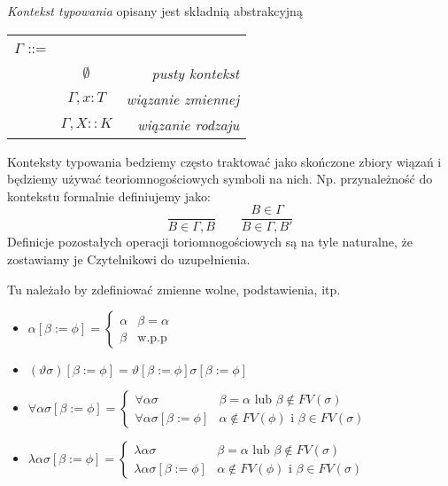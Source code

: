 \documentclass[11pt,leqno]{article}
\begin{document}
\begin{definicja}
	\emph{Kontekst typowania} opisany jest składnią abstrakcyjną
	
	\begin{tabular}{ | l c r | }
		\hline
		$\Gamma$ ::= & & \\
		& $\emptyset$ & \textit{pusty kontekst} \\
		& $\Gamma,x:T$& \textit{wiązanie zmiennej} \\ 
		& $\Gamma,X::K$& \textit{wiązanie rodzaju} \\ 
		\hline
	\end{tabular}
	
	Konteksty typowania bedziemy często traktować jako skończone zbiory wiązań i będziemy
	używać teoriomnogościowych symboli na nich. Np. przynależność do kontekstu formalnie
	definiujemy jako:
	\[
		\frac{}{B \in \Gamma,B}
		\qquad
		\frac{B \in \Gamma}{B \in \Gamma,B'}
	\]
	Definicje pozostałych operacji toriomnogościowych są na tyle naturalne, że zostawiamy
	je Czytelnikowi do uzupełnienia.
\end{definicja}

\begin{definicja}
Tu należało by zdefiniować zmienne wolne, podstawienia, itp.
    \begin{itemize}
        \item $\alpha [\beta := \phi]= \begin{cases}  \alpha & \beta=\alpha \\ \beta & \text{w.p.p} \end{cases}$
        \item $(\vartheta \sigma) [\beta := \phi] = \vartheta [\beta := \phi] \sigma [\beta := \phi]$
        \item $\forall \alpha \sigma [\beta := \phi]= \begin{cases} \forall \alpha \sigma & \beta=\alpha \text{ lub } \beta \notin FV(\sigma)\\ \forall \alpha \sigma [\beta := \phi] & \alpha \notin FV(\phi)  \text{ i } \beta \in FV(\sigma) \end{cases}$
        \item $\lambda \alpha \sigma [\beta := \phi]= \begin{cases} \lambda \alpha \sigma & \beta=\alpha \text{ lub } \beta \notin FV(\sigma)\\ \lambda \alpha \sigma [\beta := \phi] & \alpha \notin FV(\phi)  \text{ i } \beta \in FV(\sigma) \end{cases}$
    \end{itemize}
\end{definicja}
\end{document}
